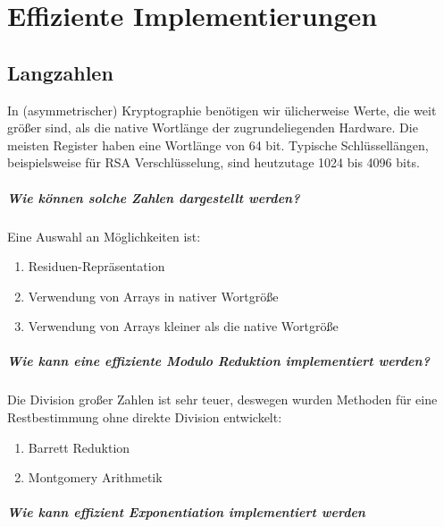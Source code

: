 \chapter{Effiziente Implementierungen}

\section{Langzahlen}

In (asymmetrischer) Kryptographie benötigen wir ülicherweise Werte, die weit größer sind, als die native Wortlänge der zugrundeliegenden Hardware.
Die meisten Register haben eine Wortlänge von 64 bit. Typische Schlüssellängen, beispielsweise für RSA Verschlüsselung, sind heutzutage 1024 bis 4096 bits.

\paragraph{Wie können solche Zahlen dargestellt werden?}

Eine Auswahl an Möglichkeiten ist:

\begin{enumerate}
    \item Residuen-Repräsentation 
    \item Verwendung von Arrays in nativer Wortgröße 
    \item Verwendung von Arrays kleiner als die native Wortgröße 
\end{enumerate}

\paragraph{Wie kann eine effiziente Modulo Reduktion implementiert werden?}

Die Division großer Zahlen ist sehr teuer, deswegen wurden Methoden für eine Restbestimmung ohne direkte Division entwickelt:

\begin{enumerate}
    \item Barrett Reduktion 
    \item Montgomery Arithmetik 
\end{enumerate}

\paragraph{Wie kann effizient Exponentiation implementiert werden}

